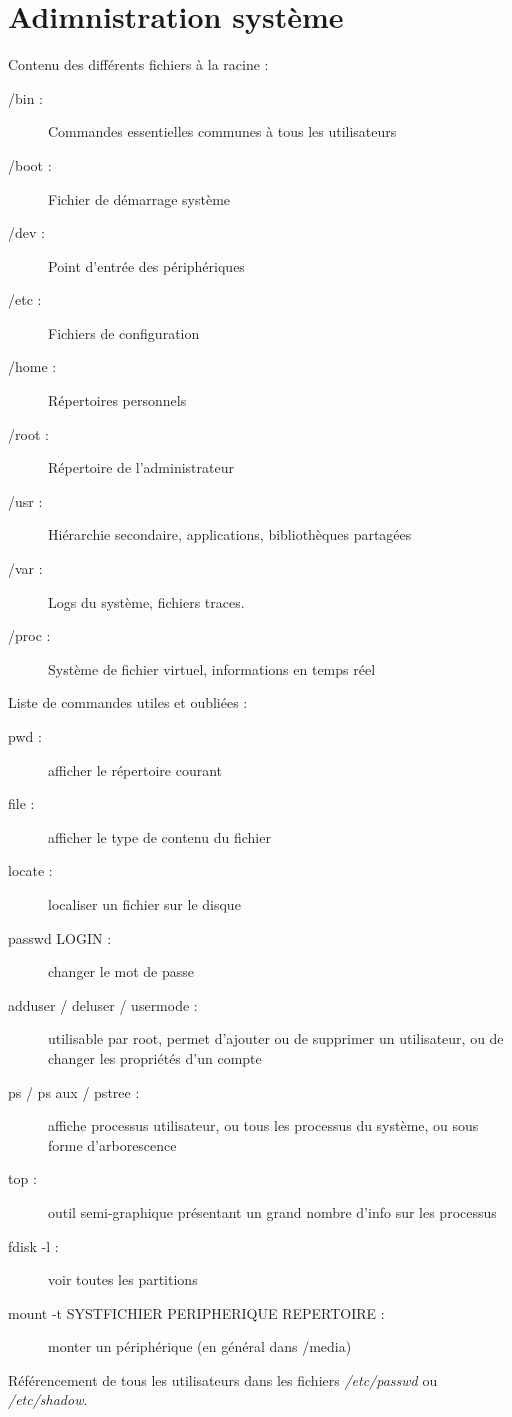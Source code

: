 \documentclass{article}
\begin{document}
\section{Adimnistration système}
Contenu des différents fichiers à la racine : 
\begin{description}
	\item[/bin :] Commandes essentielles communes à tous les utilisateurs
	\item[/boot :] Fichier de démarrage système
	\item[/dev :] Point d'entrée des périphériques
	\item[/etc :] Fichiers de configuration
	\item[/home :] Répertoires personnels
	\item[/root :] Répertoire de l'administrateur
	\item[/usr :] Hiérarchie secondaire, applications, bibliothèques partagées
	\item[/var :] Logs du système, fichiers traces.
	\item[/proc :] Système de fichier virtuel, informations en temps réel
\end{description}

\bigskip
Liste de commandes utiles et oubliées :
\begin{description}
	\item[pwd :]afficher le répertoire courant
	\item[file :] afficher le type de contenu du fichier
	\item[locate :] localiser un fichier sur le disque
	\item[passwd LOGIN :]changer le mot de passe
	\item[adduser / deluser / usermode :] utilisable par root, permet d'ajouter ou de supprimer un utilisateur, ou de changer les propriétés d'un compte
	\item[ps / ps aux / pstree :] affiche processus utilisateur, ou tous les processus du système, ou sous forme d'arborescence
	\item[top :] outil semi-graphique présentant un grand nombre d'info sur les processus
	\item[fdisk -l :] voir toutes les partitions
	\item[mount -t SYSTFICHIER PERIPHERIQUE REPERTOIRE :] monter un périphérique (en général dans /media)
\end{description}

Référencement de tous les utilisateurs dans les fichiers \textit{/etc/passwd} ou \textit{/etc/shadow}.
\end{document}
